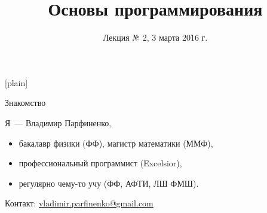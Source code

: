 %



\usepackage{pgfpages}
[plain]
\newcommand{\notep}[1]{\note{#1\par}}

\usepackage{listings}

\newcommand{\reduceBlockEqSpacing}{%
  \vspace*{-\baselineskip}\setlength\belowdisplayshortskip{0pt}%
}

\usepackage{numprint}
\newcommand{\num}[1]{\numprint{#1}}
  \npthousandsep{\,}
  \npthousandthpartsep{}
  \npdecimalsign{,}

\newcommand{\pcnum}[1]{\ensuremath{\mathtt{#1}}}
\newcommand{\bin}[1]{\pcnum{#1}_2}
\newcommand{\hex}[1]{\pcnum{#1}_{16}}

\newcommand{\code}[1]{\texttt{#1}}

\title{Основы программирования}
\subtitle{Лекция № 2, 3 марта 2016 г.}
\date{}




\begin{frame}[plain]
  \titlepage
\end{frame}

\begin{frame}{Знакомство}

  Я~--- Владимир Парфиненко,

  \begin{itemize}
    \item бакалавр физики (ФФ), магистр математики (ММФ),
    \item профессиональный программист (Excelsior),
    \item регулярно чему-то учу (ФФ, АФТИ, ЛШ ФМШ).
  \end{itemize}

  Контакт:
  \href{mailto:vladimir.parfinenko@gmail.com}{vladimir.parfinenko@gmail.com}

\end{frame}

